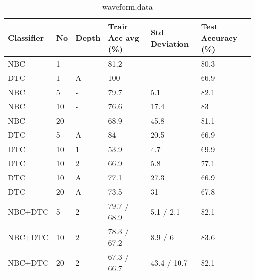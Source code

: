 \begin{table}[h]
	\centering
	\begin{tabular}[h]{l|l|l|l|l|l}
		Classifier & No & Depth & Train Acc avg (\%) & Std Deviation & Test Accuracy (\%)\\
		\hline
		NBC & 1 & -  & 81.2 & - & 80.3 \\
		DTC & 1 & A  & 100 & - & 66.9 \\
		NBC & 5 & -  & 79.7 & 5.1 & 82.1 \\
		NBC & 10 & -  & 76.6 & 17.4 & 83 \\
		NBC & 20 & -  & 68.9 & 45.8 & 81.1 \\
		DTC & 5 & A  & 84 & 20.5 & 66.9 \\
		DTC & 10 & 1  & 53.9 & 4.7 & 69.9 \\
		DTC & 10 & 2  & 66.9 & 5.8 & 77.1 \\
		DTC & 10 & A  & 77.1 & 27.3 & 66.9 \\
		DTC & 20 & A  & 73.5 & 31 & 67.8 \\
		NBC+DTC & 5 & 2  & 79.7 / 68.9 & 5.1 / 2.1 & 82.1 \\
		NBC+DTC & 10 & 2  & 78.3 / 67.2 & 8.9 / 6 & 83.6 \\
		NBC+DTC & 20 & 2  & 67.3 / 66.7 & 43.4 / 10.7 & 82.1 \\
	\end{tabular}
	\caption{waveform.data}
\end{table}
